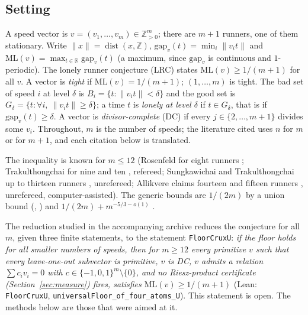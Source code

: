 \documentclass[11pt]{article}
\theoremstyle{remark}
\newcommand{\norm}[1]{\lVert #1\rVert}
\newcommand{\ML}{\mathrm{ML}}
\newcommand{\gap}{\mathrm{gap}}
\newcommand{\Z}{\mathbb{Z}}
\newcommand{\R}{\mathbb{R}}
\begin{document}
\subsection{Setting}
A speed vector is $v=(v_1,\dots,v_m)\in\Z_{>0}^m$; there are $m+1$ runners, one of them stationary. Write $\norm{x}=\operatorname{dist}(x,\Z)$, $\gap_v(t)=\min_i\norm{v_it}$ and $\ML(v)=\max_{t\in\R}\gap_v(t)$ (a maximum, since $\gap_v$ is continuous and $1$-periodic). The lonely runner conjecture (LRC) states $\ML(v)\ge1/(m+1)$ for all $v$. A vector is \emph{tight} if $\ML(v)=1/(m+1)$; $(1,\dots,m)$ is tight. The bad set of speed $i$ at level $\delta$ is $B_i=\{t:\norm{v_it}<\delta\}$ and the good set is $G_\delta=\{t:\forall i,\ \norm{v_it}\ge\delta\}$; a time $t$ is \emph{lonely at level $\delta$} if $t\in G_\delta$, that is if $\gap_v(t)\ge\delta$. A vector is \emph{divisor-complete} (DC) if every $j\in\{2,\dots,m+1\}$ divides some $v_i$. Throughout, $m$ is the number of speeds; the literature cited uses $n$ for $m$ or for $m+1$, and each citation below is translated.

The inequality is known for $m\le 12$ (Rosenfeld for eight runners \cite{Rosenfeld25}; Trakulthongchai for nine and ten \cite{Trak26}, refereed; Sungkawichai and Trakulthongchai up to thirteen runners \cite{ST26}, unrefereed; Allikvere claims fourteen and fifteen runners \cite{Allik26}, unrefereed, computer-assisted). The generic bounds are $1/(2m)$ by a union bound (\cite[Prop.~1.1]{Tao18}, \cite[Section~5]{PS25}) and $1/(2m)+m^{-5/3-o(1)}$ \cite[Thm.~1.3]{Bedert25}.

The reduction studied in the accompanying archive reduces the conjecture for all $m$, given three finite statements, to the statement \texttt{FloorCruxU}: \emph{if the floor holds for all smaller numbers of speeds, then for $m\ge12$ every primitive $v$ such that every leave-one-out subvector is primitive, $v$ is DC, $v$ admits a relation $\sum c_iv_i=0$ with $c\in\{-1,0,1\}^m\setminus\{0\}$, and no Riesz-product certificate (Section~\ref{sec:measure}) fires, satisfies $\ML(v)\ge1/(m+1)$} (Lean: \texttt{FloorCruxU}, \texttt{universalFloor\_of\_four\_atoms\_U}). This statement is open. The methods below are those that were aimed at it.
\end{document}
